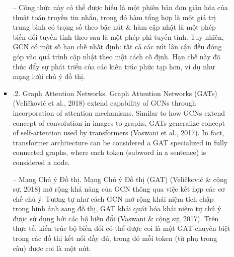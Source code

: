 \documentclass{article}
\begin{document}
\begin{itemize}
\begin{itemize}
\begin{itemize}
            -- Công thức này có thể được hiểu là một phiên bản đơn giản hóa của thuật toán truyền tin nhắn, trong đó hàm tổng hợp là một giá trị trung bình có trọng số theo bậc nút \& hàm cập nhật là một phép biến đổi tuyến tính theo sau là một phép phi tuyến tính. Tuy nhiên, GCN có một số hạn chế nhất định: tất cả các nút lân cận đều đóng góp vào quá trình cập nhật theo một cách cố định. Hạn chế này đã thúc đẩy sự phát triển của các kiến trúc phức tạp hơn, ví dụ như mạng lưới chú ý đồ thị.
            \item {.2. Graph Attention Networks.} Graph Attention Networks (GATs) (Veličković et al., 2018) extend capability of GCNs through incorporation of attention mechanisms. Similar to how GCNs extend concept of convolution in images to graphs, GATs generalize concept of self-attention used by transformers (Vaswani et al., 2017). In fact, transformer architecture can be considered a GAT specialized in fully connected graphs, where each token (subword in a sentence) is considered a node.

            -- {\sf Mạng Chú ý Đồ thị.} Mạng Chú ý Đồ thị (GAT) (Veličković \& cộng sự, 2018) mở rộng khả năng của GCN thông qua việc kết hợp các cơ chế chú ý. Tương tự như cách GCN mở rộng khái niệm tích chập trong hình ảnh sang đồ thị, GAT khái quát hóa khái niệm tự chú ý được sử dụng bởi các bộ biến đổi (Vaswani \& cộng sự, 2017). Trên thực tế, kiến trúc bộ biến đổi có thể được coi là một GAT chuyên biệt trong các đồ thị kết nối đầy đủ, trong đó mỗi token (từ phụ trong câu) được coi là một nút.


\end{itemize}
\end{itemize}
\end{itemize}
\end{document}
